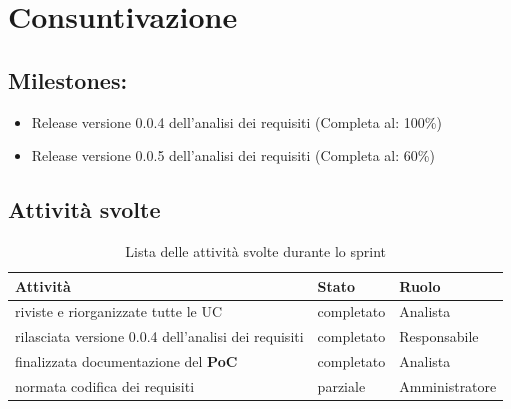 \section{Consuntivazione}

\subsection{Milestones:}
\begin{itemize}
    \item Release versione 0.0.4 dell'analisi dei requisiti (Completa al: 100\%)
    \item Release versione 0.0.5 dell'analisi dei requisiti (Completa al: 60\%)
\end{itemize}

\subsection{Attività svolte}

\begin{table}[H]
    \begin{xltabular}{\textwidth}{X l l}
        
         \textbf{Attività} & \textbf{Stato} & \textbf{Ruolo}\\
        \endhead
        \hline
        riviste e riorganizzate tutte le UC & completato & Analista \\
        rilasciata versione 0.0.4 dell'analisi dei requisiti & completato & Responsabile \\
        finalizzata documentazione del \textbf{PoC} & completato & Analista \\
        normata codifica dei requisiti & parziale & Amministratore \\
    \end{xltabular}
    \caption{Lista delle attività svolte durante lo sprint}
\end{table}


